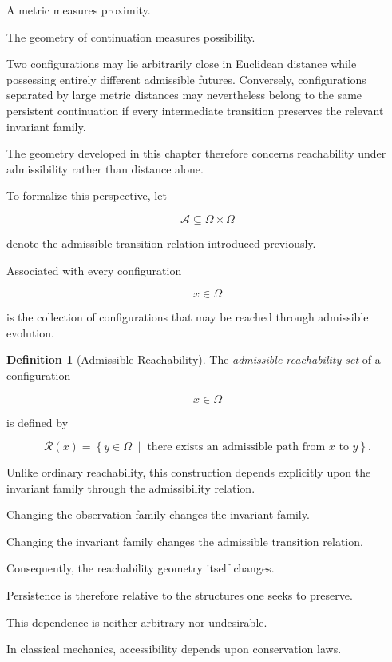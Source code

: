 \documentclass[11pt]{book}
\numberwithin{equation}{chapter}
\theoremstyle{definition}
\newtheorem{definition}{Definition}[chapter]
\theoremstyle{plain}
\begin{document}
A metric measures proximity.

The geometry of continuation measures possibility.

Two configurations may lie arbitrarily close in Euclidean distance while possessing entirely different admissible futures. Conversely, configurations separated by large metric distances may nevertheless belong to the same persistent continuation if every intermediate transition preserves the relevant invariant family.

The geometry developed in this chapter therefore concerns reachability under admissibility rather than distance alone.

To formalize this perspective, let

\[
\mathcal{A}\subseteq\Omega\times\Omega
\]

denote the admissible transition relation introduced previously.

Associated with every configuration

\[
x\in\Omega
\]

is the collection of configurations that may be reached through admissible evolution.

\begin{definition}[Admissible Reachability]

The \emph{admissible reachability set} of a configuration

\[
x\in\Omega
\]

is defined by

\[
\mathcal{R}(x)
=
\left\{
y\in\Omega
\;\middle|\;
\text{there exists an admissible path from }x\text{ to }y
\right\}.
\]

\end{definition}

Unlike ordinary reachability, this construction depends explicitly upon the invariant family through the admissibility relation.

Changing the observation family changes the invariant family.

Changing the invariant family changes the admissible transition relation.

Consequently, the reachability geometry itself changes.

Persistence is therefore relative to the structures one seeks to preserve.

This dependence is neither arbitrary nor undesirable.

In classical mechanics, accessibility depends upon conservation laws.
\end{document}
